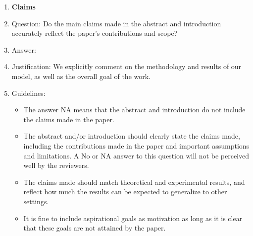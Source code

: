 \documentclass{article}
\begin{document}
 



\begin{enumerate}

\item {\bf Claims}
    \item[] Question: Do the main claims made in the abstract and introduction accurately reflect the paper's contributions and scope?
    \item[] Answer: \answerYes{} %
    \item[] Justification: We explicitly comment on the methodology and results of our model, as well as the overall goal of the work.
    \item[] Guidelines:
    \begin{itemize}
        \item The answer NA means that the abstract and introduction do not include the claims made in the paper.
        \item The abstract and/or introduction should clearly state the claims made, including the contributions made in the paper and important assumptions and limitations. A No or NA answer to this question will not be perceived well by the reviewers. 
        \item The claims made should match theoretical and experimental results, and reflect how much the results can be expected to generalize to other settings. 
        \item It is fine to include aspirational goals as motivation as long as it is clear that these goals are not attained by the paper. 
    \end{itemize}


\end{enumerate}
\end{document}
